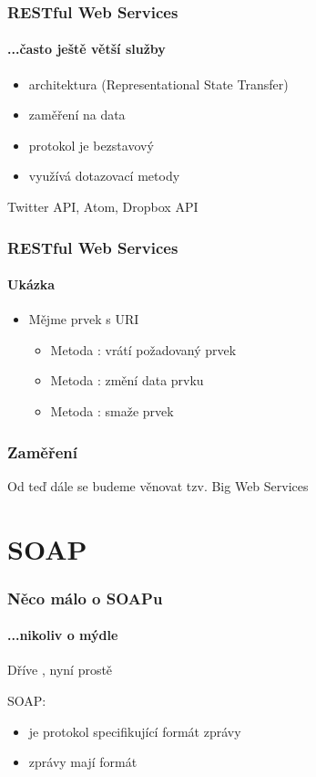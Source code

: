 \documentclass[12pt]{beamer}
\begin{document}
\begin{frame}
  \frametitle{RESTful Web Services}
  \framesubtitle{...často ještě větší služby}
	\begin{itemize}
		\item architektura  (Representational State Transfer)
		\item zaměření na data
		\item protokol je bezstavový
		\item využívá dotazovací metody 
	\end{itemize}
	\begin{example}
		Twitter API, Atom, Dropbox API
	\end{example}
\end{frame}

\begin{frame}
	\frametitle{RESTful Web Services}
	\framesubtitle{Ukázka}
	\begin{itemize}
		\item Mějme prvek s URI 
		\begin{itemize}
			\item Metoda : vrátí požadovaný prvek
			\item Metoda : změní data prvku
			\item Metoda : smaže prvek
		\end{itemize}
	\end{itemize}
	
\end{frame}

\begin{frame}
  \frametitle{Zaměření}

  \begin{example}
    Od teď dále se budeme věnovat tzv. Big Web Services
  \end{example}
\end{frame}

\section{SOAP}

\begin{frame}
  \frametitle{Něco málo o SOAPu}
  \framesubtitle{...nikoliv o mýdle}

  Dříve , nyní prostě 

  \begin{block}{SOAP:}
    \begin{itemize}
    	\item je protokol specifikující formát zprávy
		\item zprávy mají formát 
    \end{itemize}
  \end{block}
\end{frame}
\end{document}
